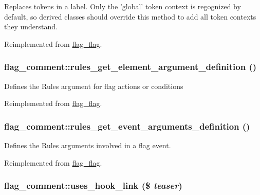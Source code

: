 Replaces tokens in a label. Only the 'global' token context is regognized by default, so derived classes should override this method to add all token contexts they understand. 

Reimplemented from \hyperlink{classflag__flag_6fa61cada1cb5f94c64b3037fdd28da1}{flag\_\-flag}.\hypertarget{classflag__comment_7b1d6ccaef3c1405005f8ff35878b2e2}{
\subsubsection[{rules\_\-get\_\-element\_\-argument\_\-definition}]{\setlength{\rightskip}{0pt plus 5cm}flag\_\-comment::rules\_\-get\_\-element\_\-argument\_\-definition ()}}
\label{classflag__comment_7b1d6ccaef3c1405005f8ff35878b2e2}


Defines the Rules argument for flag actions or conditions 

Reimplemented from \hyperlink{group__rules_g88951558f573d816de08b9e9d49ff4c2}{flag\_\-flag}.\hypertarget{classflag__comment_59dfcb8d0b77553cae330b3efb0beada}{
\subsubsection[{rules\_\-get\_\-event\_\-arguments\_\-definition}]{\setlength{\rightskip}{0pt plus 5cm}flag\_\-comment::rules\_\-get\_\-event\_\-arguments\_\-definition ()}}
\label{classflag__comment_59dfcb8d0b77553cae330b3efb0beada}


Defines the Rules arguments involved in a flag event. 

Reimplemented from \hyperlink{group__rules_g21a07dbe1a9e496438d235e95e67c048}{flag\_\-flag}.\hypertarget{classflag__comment_fae5770ee7dc6b4fc2ce56e99ac854bf}{
\subsubsection[{uses\_\-hook\_\-link}]{\setlength{\rightskip}{0pt plus 5cm}flag\_\-comment::uses\_\-hook\_\-link (\$ {\em teaser})}}
\label{classflag__comment_fae5770ee7dc6b4fc2ce56e99ac854bf}


